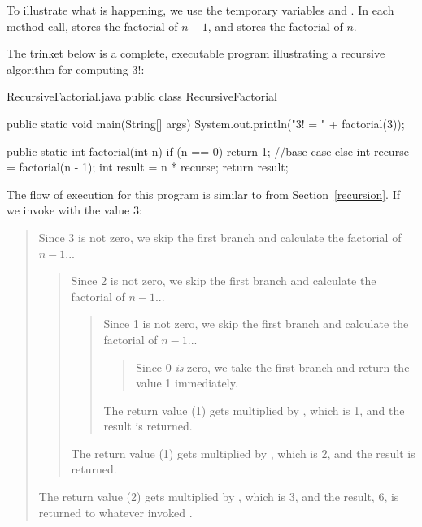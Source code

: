 To illustrate what is happening, we use the temporary variables  and .
In each method call,  stores the factorial of $n - 1$, and  stores the factorial of $n$.

The trinket below is a complete, executable program illustrating a recursive algorithm for computing 3!:

\begin{trinket} [280] {RecursiveFactorial.java}
public class RecursiveFactorial {

    public static void main(String[] args) {
       System.out.println("3! = " + factorial(3));
    }
    
    public static int factorial(int n) {
       if (n == 0) {
          return 1; //base case
       } else {
          int recurse = factorial(n - 1);
          int result = n * recurse;
          return result;
       }
    }
}
\end{trinket}

The flow of execution for this program is similar to  from Section~\ref{recursion}.
If we invoke  with the value 3:

\vspace{-1ex}
\begin{quote}
Since 3 is not zero, we skip the first branch and calculate the factorial of $n-1$...
\begin{quote}
Since 2 is not zero, we skip the first branch and calculate the factorial of $n-1$...
\begin{quote}
Since 1 is not zero, we skip the first branch and calculate the factorial of $n-1$...
\begin{quote}
Since 0 {\em is} zero, we take the first branch and return the value 1 immediately.
\end{quote}
The return value (1) gets multiplied by , which is 1, and the result is returned.
\end{quote}
The return value (1) gets multiplied by , which is 2, and the result is returned.
\end{quote}
The return value (2) gets multiplied by , which is 3, and the result, 6, is returned to whatever invoked .
\end{quote}
\vspace{-1ex}


